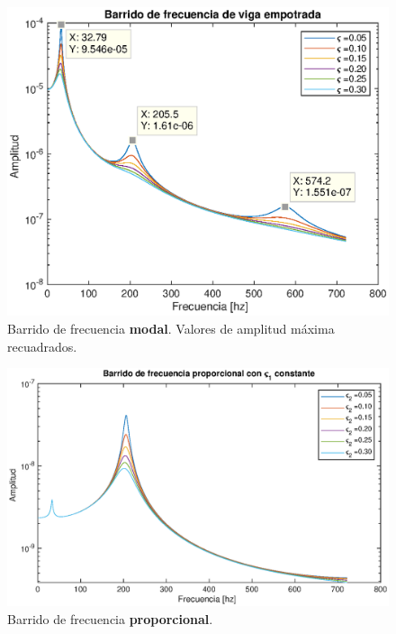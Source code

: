 \documentclass[onecolumn,10pt,titlepage,a4paper]{article}
\begin{document}
\begin{figure}[htb!]
	\centering
	\includegraphics[width=1\textwidth]{fig/sinesweep.eps}
	\caption{Barrido de frecuencia \textbf{modal}. Valores de amplitud máxima recuadrados.}
	\label{fig:sinesweepmodal}
\end{figure}

\begin{figure}[htb!]
	\centering
	\includegraphics[width=1\textwidth]{fig/sinesweepprop1const.eps}
	\caption{Barrido de frecuencia \textbf{proporcional}.}
	\label{fig:sinesweepprop1}
\end{figure}
\end{document}
